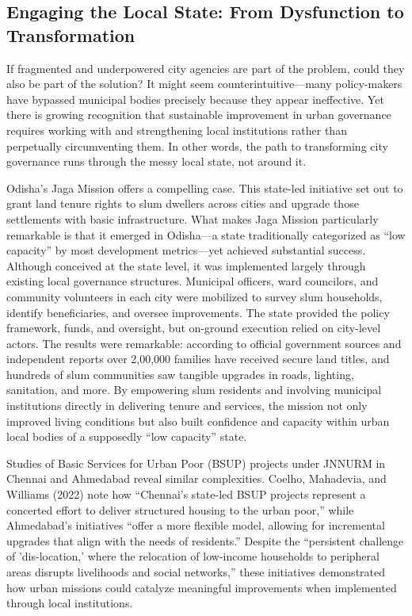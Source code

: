 \subsection{Engaging the Local State: From Dysfunction to Transformation}

If fragmented and underpowered city agencies are part of the problem, could they also be part of the solution? It might seem counterintuitive—many policy-makers have bypassed municipal bodies precisely because they appear ineffective. Yet there is growing recognition that sustainable improvement in urban governance requires working with and strengthening local institutions rather than perpetually circumventing them. In other words, the path to transforming city governance runs through the messy local state, not around it.

Odisha's Jaga Mission offers a compelling case. This state-led initiative set out to grant land tenure rights to slum dwellers across cities and upgrade those settlements with basic infrastructure. What makes Jaga Mission particularly remarkable is that it emerged in Odisha—a state traditionally categorized as ``low capacity'' by most development metrics—yet achieved substantial success. Although conceived at the state level, it was implemented largely through existing local governance structures. Municipal officers, ward councilors, and community volunteers in each city were mobilized to survey slum households, identify beneficiaries, and oversee improvements. The state provided the policy framework, funds, and oversight, but on-ground execution relied on city-level actors. The results were remarkable: according to official government sources and independent reports over 2,00,000 families have received secure land titles, and hundreds of slum communities saw tangible upgrades in roads, lighting, sanitation, and more. By empowering slum residents and involving municipal institutions directly in delivering tenure and services, the mission not only improved living conditions but also built confidence and capacity within urban local bodies of a supposedly ``low capacity'' state.

Studies of Basic Services for Urban Poor (BSUP) projects under JNNURM in Chennai and Ahmedabad reveal similar complexities. Coelho, Mahadevia, and Williams (2022) note how ``Chennai's state-led BSUP projects represent a concerted effort to deliver structured housing to the urban poor,'' while Ahmedabad's initiatives ``offer a more flexible model, allowing for incremental upgrades that align with the needs of residents.'' Despite the ``persistent challenge of 'dis-location,' where the relocation of low-income households to peripheral areas disrupts livelihoods and social networks,'' these initiatives demonstrated how urban missions could catalyze meaningful improvements when implemented through local institutions.

